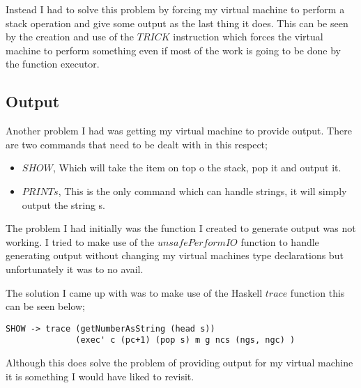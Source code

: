 Instead I had to solve this problem by forcing my virtual machine to perform a stack operation and give some output as the last thing it does. This can be seen by the creation and use of the $TRICK$ instruction which forces the virtual machine to perform something even if most of the work is going to be done by the function executor. 

\subsection{Output}

Another problem I had was getting my virtual machine to provide output. There are two commands that need to be dealt with in this respect;

\begin{itemize}
\item $SHOW$, Which will take the item on top o the stack, pop it and output it.
\item $PRINT s$, This is the only command which can handle strings, it will simply output the string s.
\end{itemize}

The problem I had initially was the function I created to generate output was not working. I tried to make use of the $unsafePerformIO$ function to handle generating output without changing my virtual machines type declarations but unfortunately it was to no avail. 

\newpage

The solution I came up with was to make use of the Haskell $trace$ function this can be seen below;

\begin{lstlisting}
SHOW -> trace (getNumberAsString (head s)) 
              (exec' c (pc+1) (pop s) m g ncs (ngs, ngc) ) 
\end{lstlisting}  

Although this does solve the problem of providing output for my virtual machine it is something I would have liked to revisit.  